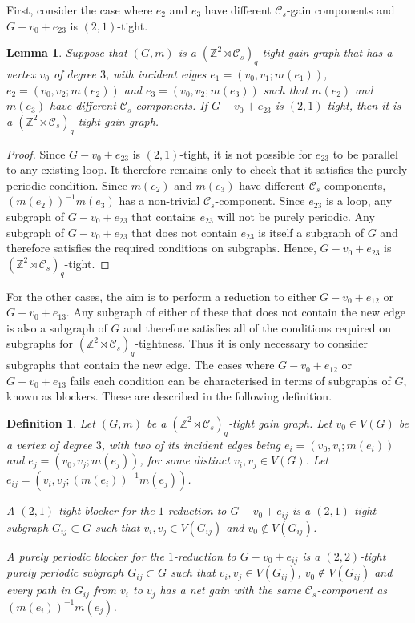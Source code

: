 \documentclass[reqno,a4paper,10pt]{article}
\newtheorem{lemma}[theorem]{Lemma}
\newtheorem{definition}[theorem]{Definition}
\theoremstyle{definition}
\theoremstyle{remark}
\numberwithin{equation}{section}
\numberwithin{figure}{section}
\numberwithin{table}{section}
\newcommand{\Z}{\mathbb{Z}}
\begin{document}
    First, consider the case where $e_2$ and $e_3$ have different $\mathcal{C}_s$-gain components and $G-v_0+e_{23}$ is $(2,1)$-tight.
    \begin{lemma}\label{Degree3Neighbour2Loop}
		Suppose that $(G,m)$ is a $(\Z^2\rtimes\mathcal{C}_s)_q$-tight gain graph that has a vertex $v_0$ of degree $3$, with incident edges $e_1=(v_0,v_1;m(e_1))$, $e_2=(v_0,v_2;m(e_2))$ and $e_3=(v_0,v_2;m(e_3))$ such that $m(e_2)$ and $m(e_3)$ have different $\mathcal{C}_s$-components. If $G-v_0+e_{23}$ is $(2,1)$-tight, then it is a $(\Z^2\rtimes\mathcal{C}_s)_q$-tight gain graph.
	\end{lemma}
	\begin{proof}
		Since $G-v_0+e_{23}$ is $(2,1)$-tight, it is not possible for $e_{23}$ to be parallel to any existing loop. It therefore remains only to check that it satisfies the purely periodic condition. Since $m(e_2)$ and $m(e_3)$ have different $\mathcal{C}_s$-components, $(m(e_2))^{-1}m(e_3)$ has a non-trivial $\mathcal{C}_s$-component. Since $e_{23}$ is a loop,  any subgraph of $G-v_0+e_{23}$ that contains $e_{23}$ will not be purely periodic. Any subgraph of $G-v_0+e_{23}$ that does not contain $e_{23}$ is itself a subgraph of $G$ and therefore satisfies the required conditions on subgraphs. Hence, $G-v_0+e_{23}$ is $(\Z^2\rtimes\mathcal{C}_s)_q$-tight.
	\end{proof}
    For the other cases, the aim is to perform a reduction to either $G-v_0+e_{12}$ or $G-v_0+e_{13}$. Any subgraph of either of these that does not contain the new edge is also a subgraph of $G$ and therefore satisfies all of the conditions required on subgraphs for $(\Z^2\rtimes\mathcal{C}_s)_q$-tightness. Thus it is only necessary to consider subgraphs that contain the new edge. The cases where $G-v_0+e_{12}$ or $G-v_0+e_{13}$ fails each condition can be characterised in terms of subgraphs of $G$, known as blockers. These are described in the following definition.
    \begin{definition}\label{Blockers3}
        Let $(G,m)$ be a $(\Z^2\rtimes\mathcal{C}_s)_q$-tight gain graph. Let $v_0\in V(G)$ be a vertex of degree $3$, with two of its incident edges being $e_i=(v_0,v_i;m(e_i))$ and $e_j=(v_0,v_j;m(e_j))$, for some distinct $v_i,v_j\in V(G)$. Let $e_{ij}=(v_i,v_j;(m(e_i))^{-1}m(e_j))$.
		
		A \emph{$(2,1)$-tight blocker} for the $1$-reduction to $G-v_0+e_{ij}$ is a $(2,1)$-tight subgraph $G_{ij}\subset G$ such that $v_i,v_j\in V(G_{ij})$ and $v_0\notin V(G_{ij})$.

        A \emph{purely periodic blocker} for the $1$-reduction to $G-v_0+e_{ij}$ is a $(2,2)$-tight purely periodic  subgraph $G_{ij}\subset G$ such that $v_i,v_j\in V(G_{ij})$, $v_0\notin V(G_{ij})$ and every path in $G_{ij}$ from $v_i$ to $v_j$ has a net gain with the same $\mathcal{C}_s$-component as $(m(e_i))^{-1}m(e_j)$.
    \end{definition}
    
\end{document}
